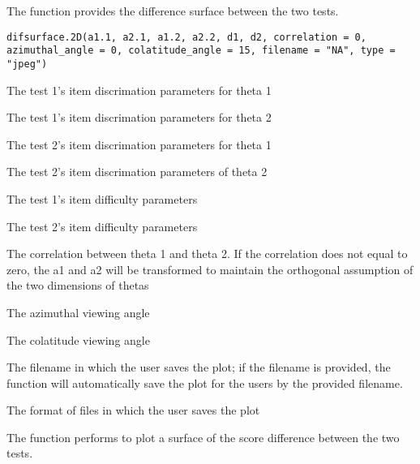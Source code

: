 \begin{Description}\relax
The function provides the difference surface between the two tests.
\end{Description}
\begin{Usage}
\begin{verbatim}
difsurface.2D(a1.1, a2.1, a1.2, a2.2, d1, d2, correlation = 0, azimuthal_angle = 0, colatitude_angle = 15, filename = "NA", type = "jpeg")
\end{verbatim}
\end{Usage}
\begin{Arguments}
\begin{ldescription}
\item[\code{a1.1}] The test 1's item discrimation parameters for theta 1  
\item[\code{a2.1}] The test 1's item discrimation parameters for theta 2 
\item[\code{a1.2}] The test 2's item discrimation parameters for theta 1 
\item[\code{a2.2}] The test 2's item discrimation parameters of theta 2 
\item[\code{d1}] The test 1's item difficulty parameters
\item[\code{d2}] The test 2's item difficulty parameters
\item[\code{correlation}] The correlation between theta 1 and theta 2. If the correlation does not equal to zero, the a1 and a2 will be transformed to maintain the orthogonal assumption of the two dimensions of thetas 
\item[\code{azimuthal\_angle}] The azimuthal viewing angle 
\item[\code{colatitude\_angle}] The colatitude viewing angle 
\item[\code{filename}] The filename in which the user saves the plot; if the filename is provided, the function will automatically save the plot for the users by the provided filename.  
\item[\code{type}] The format of files in which the user saves the plot 
\end{ldescription}
\end{Arguments}
\begin{Details}\relax
The function performs to plot a surface of the score difference between the two tests.
\end{Details}
